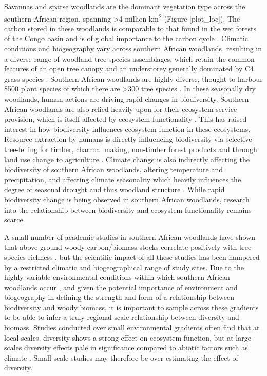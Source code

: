 \documentclass[11pt,a4paper]{article}
\begin{document}
Savannas and sparse woodlands are the dominant vegetation type across the southern African region, spanning >4 million km\textsuperscript{2} \citep{Ryan2016} (Figure \autoref{plot_loc}). The carbon stored in these woodlands is comparable to that found in the wet forests of the Congo basin and is of global importance to the carbon cycle \citep{Mayaux2008}. Climatic conditions and biogeography vary across southern African woodlands, resulting in a diverse range of woodland tree species assemblages, which retain the common features of an open tree canopy and an understorey generally dominated by C4 grass species \citep{Frost1996}. Southern African woodlands are highly diverse, thought to harbour \textapprox{}8500 plant species of which there are >300 tree species \citep{Frost1996}. In these seasonally dry woodlands, human actions are driving rapid changes in biodiversity. Southern African woodlands are also relied heavily upon for their ecosystem service provision, which is itself affected by ecosystem functionality \citep{Schulze1994}. This has raised interest in how biodiversity influences ecosystem function in these ecosystems. Resource extraction by humans is directly influencing biodiversity via selective tree-felling for timber, charcoal making, non-timber forest products and through land use change to agriculture \citep{Aleman2016, Ryan2016}. Climate change is also indirectly affecting the biodiversity of southern African woodlands, altering temperature and precipitation, and affecting climate seasonality which heavily influences the degree of seasonal drought and thus woodland structure \citep{Scholes2004, Eldridge2012}. While rapid biodiversity change is being observed in southern African woodlands, research into the relationship between biodiversity and ecosystem functionality remains scarce.

A small number of academic studies in southern African woodlands have shown that above ground woody carbon/biomass stocks correlate positively with tree species richness \citep{McNicol2018, Shirima2015, Mutowo2012}, but the scientific impact of all these studies has been hampered by a restricted climatic and biogeographical range of study sites. Due to the highly variable environmental conditions within which southern African woodlands occur \citep{Frost1996}, and given the potential importance of environment and biogeography in defining the strength and form of a relationship between biodiversity and woody biomass, it is important to sample across these gradients to be able to infer a truly regional scale relationship between diversity and biomass. Studies conducted over small environmental gradients often find that at local scales, diversity shows a strong effect on ecosystem function, but at large scales diversity effects pale in significance compared to abiotic factors such as climate \citep{Pasari2013}. Small scale studies may therefore be over-estimating the effect of diversity.
\end{document}
